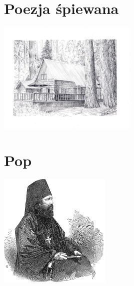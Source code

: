 \documentclass[11pt, twoside]{book}
\let\clearpage\relax
\begin{document}
\chapter{Poezja śpiewana}
\begin{center}
    \includegraphics[width=0.5\textwidth]{images/chatka.jpg}
\end{center}
\pagestyle{poezja}
\newpage\pagestyle{poezja}

\newpage\pagestyle{poezja}








\newpage\pagestyle{poezja}


\chapter{Pop}
\begin{center}
    \includegraphics[width=0.4\textwidth]{images/pop.png}
\end{center}
\pagestyle{pop}




\newpage\pagestyle{pop}




\newpage\pagestyle{pop}








\clearpage{\mbox{}\pagestyle{empty}\cleardoublepage}
\end{document}
